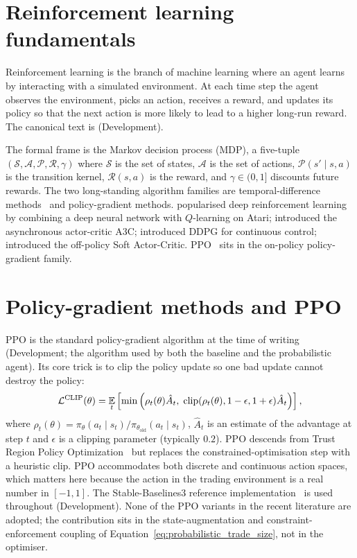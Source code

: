 \section{Reinforcement learning fundamentals}
\label{sec:rl_fundamentals}

Reinforcement learning is the branch of machine learning where an agent learns by interacting with a simulated environment. At each time step the agent observes the environment, picks an action, receives a reward, and updates its policy so that the next action is more likely to lead to a higher long-run reward. The canonical text is \textcite{sutton2018reinforcement} (Development).

The formal frame is the Markov decision process (MDP), a five-tuple $(\mathcal{S}, \mathcal{A}, \mathcal{P}, \mathcal{R}, \gamma)$ where $\mathcal{S}$ is the set of states, $\mathcal{A}$ is the set of actions, $\mathcal{P}(s' \mid s, a)$ is the transition kernel, $\mathcal{R}(s, a)$ is the reward, and $\gamma \in (0, 1]$ discounts future rewards. The two long-standing algorithm families are temporal-difference methods~\parencite{sutton1988td} and policy-gradient methods. \textcite{mnih2015dqn} popularised deep reinforcement learning by combining a deep neural network with $Q$-learning on Atari; \textcite{mnih2016asynchronous} introduced the asynchronous actor-critic A3C; \textcite{lillicrap2016continuous} introduced DDPG for continuous control; \textcite{haarnoja2018soft} introduced the off-policy Soft Actor-Critic. PPO~\parencite{schulman2017ppo} sits in the on-policy policy-gradient family.

\section{Policy-gradient methods and PPO}
\label{sec:ppo}

PPO is the standard policy-gradient algorithm at the time of writing (Development; the algorithm used by both the baseline and the probabilistic agent). Its core trick is to clip the policy update so one bad update cannot destroy the policy:
\begin{equation}
  \label{eq:ppo_clip}
  \mathcal{L}^{\mathrm{CLIP}}(\theta) = \operatorname*{\mathbb{E}}_t \left[\min\left(\rho_t(\theta) \hat{A}_t, \; \mathrm{clip}(\rho_t(\theta), 1 - \epsilon, 1 + \epsilon) \hat{A}_t\right) \right],
\end{equation}
where $\rho_t(\theta) = \pi_\theta(a_t \mid s_t) / \pi_{\theta_{\text{old}}}(a_t \mid s_t)$, $\hat{A}_t$ is an estimate of the advantage at step $t$ and $\epsilon$ is a clipping parameter (typically $0.2$). PPO descends from Trust Region Policy Optimization~\parencite{schulman2015trpo} but replaces the constrained-optimisation step with a heuristic clip. PPO accommodates both discrete and continuous action spaces, which matters here because the action in the trading environment is a real number in $[-1, 1]$. The Stable-Baselines3 reference implementation~\parencite{raffin2021sb3} is used throughout (Development). None of the PPO variants in the recent literature are adopted; the contribution sits in the state-augmentation and constraint-enforcement coupling of Equation~\ref{eq:probabilistic_trade_size}, not in the optimiser.

